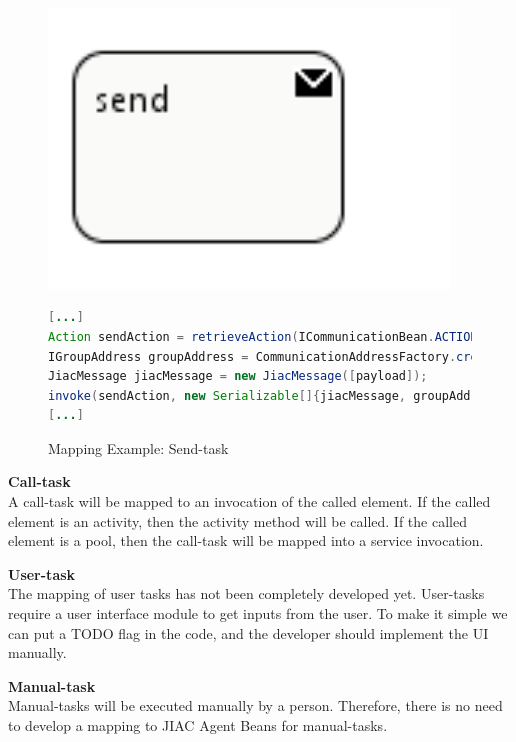 \begin{figure}[h]
\begin{minipage}[c]{0.3\textwidth}
\includegraphics[width=0.95\textwidth]{images/mapping/sendTask.png}
\end{minipage}
\begin{minipage}[c]{0.7\textwidth}
\begin{lstlisting}[language=Java]
[...]
Action sendAction = retrieveAction(ICommunicationBean.ACTION_SEND);
IGroupAddress groupAddress = CommunicationAddressFactory.createGroupAddress([address]);
JiacMessage jiacMessage = new JiacMessage([payload]);
invoke(sendAction, new Serializable[]{jiacMessage, groupAddress});
[...]
\end{lstlisting}
\end{minipage}
\caption{Mapping Example: Send-task}%
\label{fig:send_task}%
\end{figure}


\textbf{Call-task}\\
A call-task will be mapped to an invocation of the called element. If the called element is an activity, then the activity method will be called. 
If the called element is a pool, then the call-task will be mapped into a service invocation. 

\textbf{User-task}\\
The mapping of user tasks has not been completely developed yet. User-tasks require a user interface module to get inputs from the user. To make it simple we can put a TODO flag in the code, and the developer should implement the UI manually. 

\textbf{Manual-task}\\
Manual-tasks will be executed manually by a person. Therefore, there is no need to develop a mapping to JIAC Agent Beans for manual-tasks.


